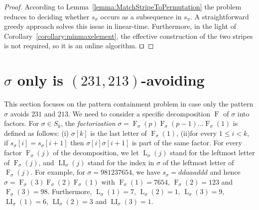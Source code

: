 \documentclass[a4paper]{llncs}
\DeclareMathOperator{\AV}{Av}
\newcommand{\pmotif}{\sigma}
\DeclareMathOperator{\firsta}{L}
\newcommand{\first}[2]{\firsta_{{#1}}({#2})}
\DeclareMathOperator{\firstia}{LI}
\newcommand{\firsti}[2]{\firstia_{{#1}}({#2})}
\DeclareMathOperator{\factora}{F}
\newcommand{\factor}[2]{\factora_{{#1}}({#2})}
\begin{document}
\begin{proof}
According to Lemma~\ref{lemma:MatchStripeToPermutation} the problem reduces
to deciding whether $s_\sigma$ occurs as a subsequence in $s_\pi$.
A straightforward greedy approach solves this issue in linear-time.
Furthermore, in the light of Corollary~\ref{corollary:minmaxelement},
the effective construction of the two stripes is not required,
so it is an online algorithm.
$\qed$
\end{proof}


\section{$\sigma$ only is $(231,213)$-avoiding}
\label{section:sigma only avoid 231 and 213}

This section focuses on the pattern containment problem
in case only the pattern $\sigma$ avoids $231$ and $213$.
We need to consider a specific decomposition $\factora$ of $\sigma$ into factors.
For $\sigma \in S_k$, the \emph{factorization}
$\sigma = \factor{\pmotif}{p} \factor{\pmotif}{p-1} \ldots \factor{\pmotif}{1}$
is defined as follows:
(i) $\sigma[k]$ is the last letter of $\factor{\pmotif}{1}$,
(ii)for every $1 \leq i < k$,
if $s_\sigma[i] = s_\sigma[i+1]$ then
$\sigma[i]\sigma[i+1]$ is part of the same factor.
For every factor $\factor{\pmotif}{j}$ of the decomposition, we let
$\first{\pmotif}{j}$ stand for the leftmost letter of $\factor{\pmotif}{j}$,
and $\firsti{\pmotif}{j}$ stand for the index in $\sigma$
of the leftmost letter of $\factor{\pmotif}{j}$.
For example,
for $\sigma = 981237654$,
we have
$s_\sigma = ddaaaddd$ and hence
$\sigma = \factor{\pmotif}{3} \factor{\pmotif}{2} \factor{\pmotif}{1}$ with
$\factor{\pmotif}{1} =7654$, $\factor{\pmotif}{2} = 123$ and $\factor{\pmotif}{3} = 98$.
Furthermore,
$\first{\pmotif}{1} = 7$, $\first{\pmotif}{2} = 1$, $\first{\pmotif}{3} = 9$,
$\firsti{\pmotif}{1} = 6$, $\firsti{\pmotif}{2} = 3$ and $\firsti{\pmotif}{3} = 1$.
\end{document}
